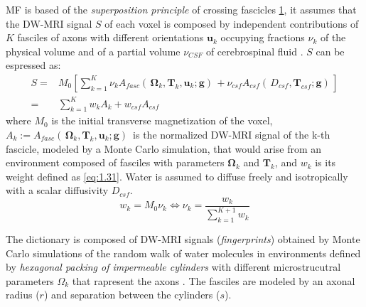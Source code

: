 MF is based of the \emph{superposition principle} of crossing fascicles \ref{fig:superposition}, it assumes that the DW-MRI signal $S$ of each voxel is composed by independent contributions of $K$ fasciles of axons with different orientations $\mathbf{u}_k$ occupying fractions $\nu_k$ of the physical volume and of a partial volume $\nu_{CSF}$ of cerebrospinal fluid \cite{rensonnet2019towards}. $S$ can be espressed as:
 \begin{equation}
  \begin{aligned}
   S ={} & M_0 \left[ \sum_{k=1}^{K} \nu_k A_{fasc} ( \,\mathbf{\Omega}_k,\mathbf{T}_k,\mathbf{u}_k;\mathbf{g}) \, + \nu_{csf} A_{csf}( \,D_{csf}, \mathbf{T}_{csf};\mathbf{g}) \, \right] \\
    = & \sum_{k=1}^{K} w_k A_k + w_{csf}A_{csf} 
  \end{aligned}
 \end{equation}
 where $M_0$ is the initial transverse magnetization of the voxel, $A_k := A_{fasc} ( \,\mathbf{\Omega}_k,\mathbf{T}_k,\mathbf{u}_k;\mathbf{g}) \,$ is the normalized DW-MRI signal of the k-th fascicle, modeled by a Monte Carlo simulation, that would arise from an environment composed of fasciles with parameters $\mathbf{\Omega}_k$ and $\mathbf{T}_k$, and $w_k$ is its weight defined as \ref{eq:1.31}. Water is assumed to diffuse freely and isotropically with a scalar diffusivity $D_{csf}$.
 \begin{equation}\label{eq:1.31}
   w_k = M_0\nu_k \iff \nu_k = \frac{w_k}{\sum_{k=1}^{K+1} w_k}
 \end{equation}

  \begin{figure}[h]
   \centering
   \caption{}
   \label{fig:superposition}
 \end{figure}

 The dictionary is composed of DW-MRI signals (\emph{fingerprints}) obtained by Monte Carlo simulations of the random walk of water molecules in environments defined by \emph{hexagonal packing of impermeable cylinders} with different microstrucutral parameters $\Omega_k$ that rapresent the axons \cite{rensonnet2019towards}. The fasciles are modeled by an axonal radius ($r$) and separation between the cylinders ($s$).

  \begin{figure}[h]
   \centering
   \caption{}
   \label{fig:hexagonal packing}
 \end{figure}

